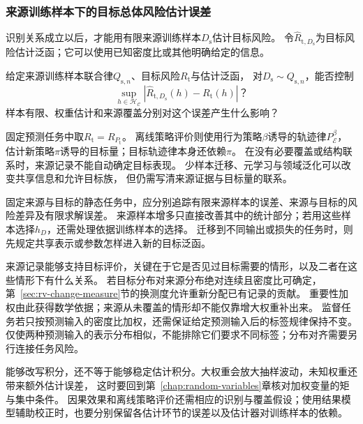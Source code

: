 \subsubsection{来源训练样本下的目标总体风险估计误差}
\label{sec:future-analysis-source-target-estimation}

识别关系成立以后，才能用有限来源训练样本$D_{\mathrm s}$估计目标风险。
令$\widehat R_{\mathrm t,D_{\mathrm s}}$为目标风险估计泛函；它可以使用已知密度比或其他明确给定的信息。

\begin{mathproblem}[有限来源训练样本的目标风险误差]
  \label{question:future-source-target-estimation}
  给定来源训练样本联合律$Q_{{\mathrm s},n}$、目标风险$R_{\mathrm t}$与估计泛函，
  对$D_{\mathrm s}\sim Q_{{\mathrm s},n}$，能否控制
  \[
    \sup_{h\in\mathcal H_{\mathcal C}}
    |\widehat R_{\mathrm t,D_{\mathrm s}}(h)-R_{\mathrm t}(h)|\text{？}
  \]
  样本有限、权重估计和来源覆盖分别对这个误差产生什么影响？
\end{mathproblem}



固定预测任务中取$R_{\mathrm t}=R_{P_{\mathrm t}}$。
离线策略评价则使用行为策略$\beta$诱导的轨迹律$P_{\mathcal E}^{\beta}$，
估计新策略$\pi$诱导的目标量；目标轨迹律本身还依赖$\pi$。
在没有必要覆盖或结构联系时，来源记录不能自动确定目标表现。
少样本迁移、元学习与领域泛化可以改变共享信息和允许目标族，
但仍需写清来源证据与目标量的联系。

固定来源与目标的静态任务中，应分别追踪有限来源样本的误差、来源与目标的风险差异及有限求解误差。
来源样本增多只直接改善其中的统计部分；若用这些样本选择$h_D$，还需处理依据训练样本的选择。
迁移到不同输出或损失的任务时，则先规定共享表示或参数怎样进入新的目标泛函。

来源记录能够支持目标评价，关键在于它是否见过目标需要的情形，以及二者在这些情形下有什么关系。
若目标分布对来源分布绝对连续且密度比可确定，第~\ref{sec:rv-change-measure}节的换测度允许重新分配已有记录的贡献。
重要性加权由此获得数学依据；来源从未覆盖的情形却不能仅靠增大权重补出来。
监督任务若只按预测输入的密度比加权，还需保证给定预测输入后的标签规律保持不变。
仅使两种预测输入的表示分布相似，不能排除它们要求不同标签；分布对齐需要另行连接任务风险。

能够改写积分，还不等于能够稳定估计积分。大权重会放大抽样波动，未知权重还带来额外估计误差，
这时要回到第~\ref{chap:random-variables}章核对加权变量的矩与集中条件。
因果效果和离线策略评价还需相应的识别与覆盖假设；使用结果模型辅助校正时，也要分别保留各估计环节的误差以及估计器对训练样本的依赖。

